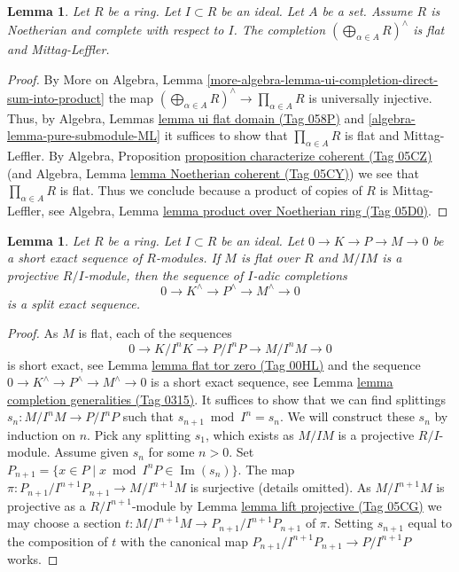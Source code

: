 \documentclass{amsart}
\theoremstyle{plain}
\newtheorem{lemma}[subsection]{Lemma}
\theoremstyle{definition}
\theoremstyle{remark}
\numberwithin{equation}{subsection}
\def\Im{\mathop{\mathrm{Im}}}
\begin{document}
\begin{lemma}
\label{lemma-completed-direct-sum-ML}
Let $R$ be a ring. Let $I \subset R$ be an ideal. Let $A$ be a set.
Assume $R$ is Noetherian and complete with respect to $I$. The completion
$(\bigoplus\nolimits_{\alpha \in A} R)^\wedge$
is flat and Mittag-Leffler.
\end{lemma}

\begin{proof}
By
More on Algebra, Lemma
\ref{more-algebra-lemma-ui-completion-direct-sum-into-product}
the map $(\bigoplus\nolimits_{\alpha \in A} R)^\wedge
\to \prod_{\alpha \in A} R$ is universally injective.
Thus, by
Algebra, Lemmas \href{https://stacks.math.columbia.edu/tag/058P}{lemma ui flat domain (Tag 058P)} and
\ref{algebra-lemma-pure-submodule-ML}
it suffices to show that $\prod_{\alpha \in A} R$ is flat and Mittag-Leffler.
By
Algebra, Proposition \href{https://stacks.math.columbia.edu/tag/05CZ}{proposition characterize coherent (Tag 05CZ)}
(and
Algebra, Lemma \href{https://stacks.math.columbia.edu/tag/05CY}{lemma Noetherian coherent (Tag 05CY)})
we see that $\prod_{\alpha \in A} R$ is flat.
Thus we conclude because a product of copies of $R$ is Mittag-Leffler, see
Algebra, Lemma \href{https://stacks.math.columbia.edu/tag/05D0}{lemma product over Noetherian ring (Tag 05D0)}.
\end{proof}


\begin{lemma}
\label{algebra-lemma-split-completed-sequence}
Let $R$ be a ring. Let $I \subset R$ be an ideal.
Let $0 \to K \to P \to M \to 0$ be a short exact sequence of
$R$-modules. If $M$ is flat over $R$ and $M/IM$ is a projective
$R/I$-module, then the sequence of $I$-adic completions
$$
0 \to K^\wedge \to P^\wedge \to M^\wedge \to 0
$$
is a split exact sequence.
\end{lemma}

\begin{proof}
As $M$ is flat, each of the sequences
$$
0 \to K/I^nK \to P/I^nP \to M/I^nM \to 0
$$
is short exact, see
Lemma \href{https://stacks.math.columbia.edu/tag/00HL}{lemma flat tor zero (Tag 00HL)}
and the sequence $0 \to K^\wedge \to P^\wedge \to M^\wedge \to 0$
is a short exact sequence, see
Lemma \href{https://stacks.math.columbia.edu/tag/0315}{lemma completion generalities (Tag 0315)}.
It suffices to show that we can find splittings
$s_n : M/I^nM \to P/I^nP$ such that $s_{n + 1} \bmod I^n = s_n$.
We will construct these $s_n$ by induction on $n$.
Pick any splitting $s_1$, which exists as $M/IM$ is a projective $R/I$-module.
Assume given $s_n$ for some $n > 0$. Set
$P_{n + 1} = \{x \in P \mid x \bmod I^nP \in \Im(s_n)\}$.
The map $\pi : P_{n + 1}/I^{n + 1}P_{n + 1} \to M/I^{n + 1}M$ is surjective
(details omitted). As $M/I^{n + 1}M$ is projective as a $R/I^{n + 1}$-module
by
Lemma \href{https://stacks.math.columbia.edu/tag/05CG}{lemma lift projective (Tag 05CG)}
we may choose a section
$t : M/I^{n + 1}M \to P_{n + 1}/I^{n + 1}P_{n + 1}$
of $\pi$. Setting $s_{n + 1}$ equal to the composition of
$t$ with the canonical map $P_{n + 1}/I^{n + 1}P_{n + 1} \to P/I^{n + 1}P$
works.
\end{proof}
\end{document}
